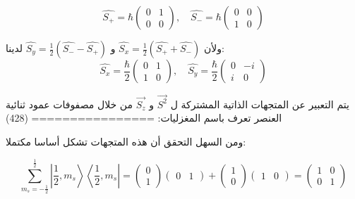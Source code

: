 \begin{equation}
\hat{S_{+}}	=\hbar\left(\begin{array}{ll}
		0 & 1 \\
		0 & 0
	\end{array}\right),\quad
	\hat{S_{-}}	=\hbar\left(\begin{array}{ll}
		0 & 0 \\
		1 & 0
	\end{array}\right)
\end{equation}

ولأن 
$\hat{S_{x}}=\frac{1}{2}(\hat{S_{+}}+\hat{S_{-}})$
و 
$\hat{S_{y}}=\frac{1}{2}(\hat{S_{-}}-\hat{S_{+}})$
لدينا:
\begin{equation}
	\hat{S_{x}}  =  \frac{ \hbar}{2}\left(\begin{array}{ll}
		0 & 1 \\
		1 & 0
	\end{array}\right),\quad
		\hat{S_{y}}  =  \frac{ \hbar}{2}\left(\begin{array}{ll}
		0 & -i \\
		i & 0
	\end{array}\right)
\end{equation}

يتم التعبير عن المتجهات الذاتية المشتركة ل  
$\vec{S^{2}}$
و $\vec{S_{z}} $
 من خلال مصفوفات عمود ثنائية العنصر تعرف باسم المغزليات:
================ (428)





ومن السهل التحقق أن هذه المتجهات تشكل أساسا مكتملا:

\begin{equation}
	\sum_{m_s=-\frac{1}{2}}^{\frac{1}{2}}\left|\frac{1}{2}, m_s\right\rangle\left\langle\frac{1}{2}, m_s\right|=\left(\begin{array}{l}
		0 \\
		1
	\end{array}\right)\left(\begin{array}{ll}
		0 & 1
	\end{array}\right)+\left(\begin{array}{l}
		1 \\
		0
	\end{array}\right)\left(\begin{array}{ll}
		1 & 0
	\end{array}\right)=\left(\begin{array}{ll}
		1 & 0 \\
		0 & 1
	\end{array}\right) 
\end{equation}

